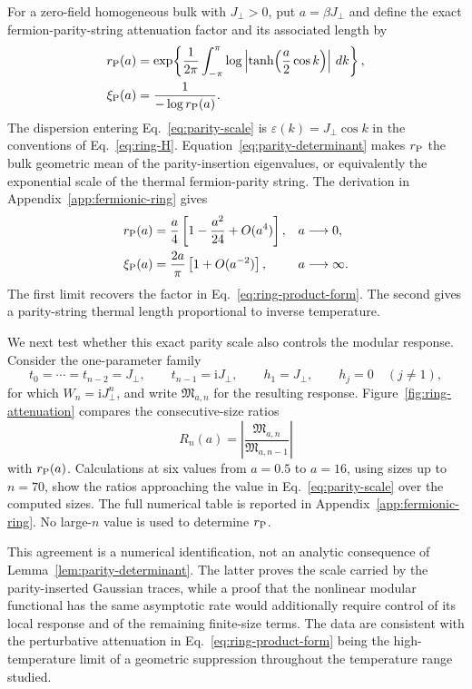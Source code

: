 \documentclass[11pt]{article}
\newcommand{\Mmod}{\mathfrak{M}}
\newcommand{\ii}{\mathrm{i}}
\begin{document}
For a zero-field homogeneous bulk with $J_\perp>0$, put
$a=\beta J_\perp$ and define
the exact
fermion-parity-string attenuation factor and its associated length by
\begin{align}
 r_{\rm P}(a)
 &=\exp\!\left\{\frac{1}{2\pi}\int_{-\pi}^{\pi}
 \log\left|\tanh\!\left(\frac a2\cos k\right)\right|\,dk\right\},
 \label{eq:parity-scale}\\
 \xi_{\rm P}(a)&=\frac{1}{-\log r_{\rm P}(a)}.
 \label{eq:parity-length}
\end{align}
The dispersion entering Eq.~\eqref{eq:parity-scale} is
$\varepsilon(k)=J_\perp\cos k$ in the conventions of
Eq.~\eqref{eq:ring-H}.  Equation~\eqref{eq:parity-determinant} makes
$r_{\rm P}$ the bulk geometric mean of the parity-insertion eigenvalues,
or equivalently the exponential scale of the thermal fermion-parity string.
The derivation in Appendix~\ref{app:fermionic-ring} gives
\begin{align}
 r_{\rm P}(a)
 &=\frac a4\left[1-\frac{a^2}{24}+O(a^4)\right],
 &&a\longrightarrow0,
 \label{eq:parity-high-T}\\
 \xi_{\rm P}(a)
 &=\frac{2a}{\pi}\left[1+O(a^{-2})\right],
 &&a\longrightarrow\infty.
 \label{eq:parity-low-T}
\end{align}
The first limit recovers the factor in Eq.~\eqref{eq:ring-product-form}.
The second gives a parity-string thermal length proportional to inverse
temperature.

We next test whether this exact parity scale also controls the modular
response.  Consider the one-parameter family
\begin{equation}
 t_0=\cdots=t_{n-2}=J_\perp,\qquad
 t_{n-1}=\ii J_\perp,\qquad
 h_1=J_\perp,\qquad h_j=0\quad(j\ne1),
 \label{eq:attenuation-family}
\end{equation}
for which $W_n=\ii J_\perp^n$, and write $\Mmod_{a,n}$ for the resulting
response.  Figure~\ref{fig:ring-attenuation} compares the consecutive-size
ratios
\begin{equation}
 R_n(a)=\left|\frac{\Mmod_{a,n}}{\Mmod_{a,n-1}}\right|
 \label{eq:modular-size-ratio}
\end{equation}
with $r_{\rm P}(a)$.  Calculations at six values from $a=0.5$ to $a=16$,
using sizes up to $n=70$, show the ratios approaching the value in
Eq.~\eqref{eq:parity-scale} over the computed sizes.  The full numerical table
is reported in Appendix~\ref{app:fermionic-ring}.  No large-$n$ value is used
to determine $r_{\rm P}$.

This agreement is a numerical identification, not an analytic consequence
of Lemma~\ref{lem:parity-determinant}.  The latter proves the scale carried by
the parity-inserted Gaussian traces, while a proof that the nonlinear modular
functional has the same asymptotic rate would additionally require control of
its local response and of the remaining finite-size terms.  The data are
consistent with the perturbative attenuation in
Eq.~\eqref{eq:ring-product-form} being the high-temperature limit of a
geometric suppression throughout the temperature range studied.
\end{document}
